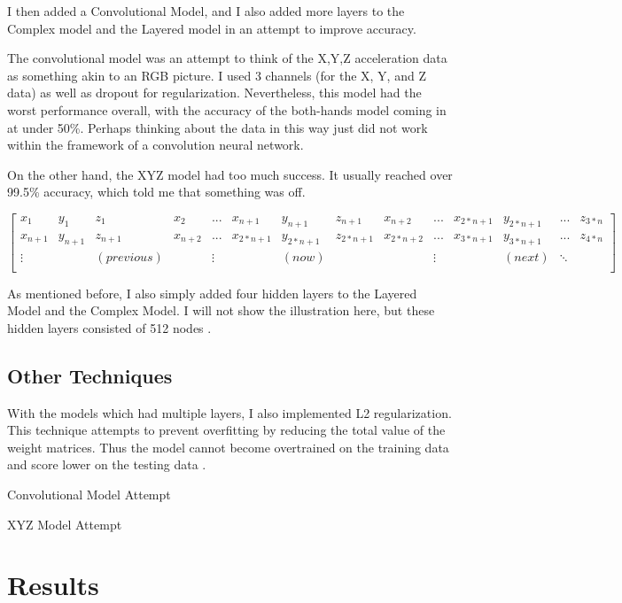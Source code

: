 \documentclass[]{report}
\begin{document}
I then added a Convolutional Model, and I also added more layers to the Complex model and the Layered model in an attempt to improve accuracy.

The convolutional model was an attempt to think of the X,Y,Z acceleration data as something akin to an RGB picture. I used 3 channels (for the X, Y, and Z data) as well as dropout for regularization. Nevertheless, this model had the worst performance overall, with the accuracy of the both-hands model coming in at under 50\%. Perhaps thinking about the data in this way just did not work within the framework of a convolution neural network.

On the other hand, the XYZ model had too much success. It usually reached over 99.5\% accuracy, which told me that something was off. 


$$
\left[
\begin{array}{cccccccccccccc}
x_{1} & y_{1} & z_{1} & x_{2} & ... & x_{n+1} & y_{n+1} & z_{n+1} & x_{n+2} & ... & x_{2*n+1} & y_{2*n+1} & ... & z_{3*n} \\
x_{n+1} & y_{n+1} & z_{n+1} & x_{n+2} & ... & x_{2*n+1} & y_{2*n+1} & z_{2*n+1} & x_{2*n+2} & ... & x_{3*n+1} & y_{3*n+1} & ... & z_{4*n} \\
\vdots & & (previous) & & \vdots & & (now) & &  & \vdots & & (next) & \ddots\\
\end{array}
\right]
$$

As mentioned before, I also simply added four hidden layers to the Layered Model and the Complex Model. I will not show the illustration here, but these hidden layers consisted of 512 nodes \cite{Goodfellow-et-al-2016}. 

\section{Other Techniques}

With the models which had multiple layers, I also implemented L2 regularization. This technique attempts to prevent overfitting by reducing the total value of the weight matrices. Thus the model cannot become overtrained on the training data and score lower on the testing data \cite{Hammerla}.

Convolutional Model Attempt

XYZ Model Attempt

\chapter{Results}
\end{document}
